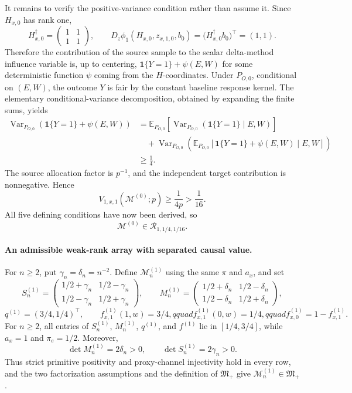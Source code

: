It remains to verify the positive-variance condition rather than assume it. Since \(H_{x,0}\) has rank one,
\[
H_{x,0}^{\dagger}=
\begin{pmatrix}1&1\\1&1\end{pmatrix},
\qquad
D_z\phi_1(H_{x,0},z_{x,1,0},b_0)
=\bigl(H_{x,0}^{\dagger}b_0\bigr)^{\top}=(1,1).
\]
Therefore the contribution of the source sample to the scalar delta-method influence variable is, up to centering, \(\mathbf 1\{Y=1\}+\psi(E,W)\) for some deterministic function \(\psi\) coming from the \(H\)-coordinates. Under \(P_{O,0}\), conditional on \((E,W)\), the outcome \(Y\) is fair by the constant baseline response kernel. The elementary conditional-variance decomposition, obtained by expanding the finite sums, yields
\[
\begin{split}
\operatorname{Var}_{P_{O,0}}\!\left(\mathbf 1\{Y=1\}+\psi(E,W)\right)
&=\mathbb E_{P_{O,0}}\!\left[\operatorname{Var}_{P_{O,0}}\!\left(\mathbf 1\{Y=1\}\mid E,W\right)\right]\\
&\quad+\operatorname{Var}_{P_{O,0}}\!\left(
\mathbb E_{P_{O,0}}[\mathbf 1\{Y=1\}+\psi(E,W)\mid E,W]
\right)\\
&\ge\frac14.
\end{split}
\]
The source allocation factor is \(p^{-1}\), and the independent target contribution is nonnegative. Hence
\[
V_{1,x,1}(\mathcal M^{(0)};p)\ge\frac{1}{4p}>\frac1{16}.
\]
All five defining conditions have now been derived, so
\[
\mathcal M^{(0)}\in\mathcal R_{1,1/4,1/16}.
\]

\paragraph{An admissible weak-rank array with separated causal value.}
For \(n\ge2\), put \(\gamma_n=\delta_n=n^{-2}\). Define \(\mathcal M^{(1)}_n\) using the same \(\pi\) and \(a_x\), and set
\[
S^{(1)}_n=
\begin{pmatrix}
1/2+\gamma_n&1/2-\gamma_n\\
1/2-\gamma_n&1/2+\gamma_n
\end{pmatrix},\qquad
M^{(1)}_n=
\begin{pmatrix}
1/2+\delta_n&1/2-\delta_n\\
1/2-\delta_n&1/2+\delta_n
\end{pmatrix},
\]
\[
q^{(1)}=(3/4,1/4)^{\top},\qquad
f^{(1)}_{x,1}(1,w)=3/4,qquad
f^{(1)}_{x,1}(0,w)=1/4,qquad
f^{(1)}_{x,0}=1-f^{(1)}_{x,1}.
\]
For \(n\ge2\), all entries of \(S^{(1)}_n\), \(M^{(1)}_n\), \(q^{(1)}\), and \(f^{(1)}\) lie in \([1/4,3/4]\), while \(a_x=1\) and \(\pi_e=1/2\). Moreover,
\[
\det M^{(1)}_n=2\delta_n>0,
\qquad
\det S^{(1)}_n=2\gamma_n>0.
\]
Thus strict primitive positivity and proxy-channel injectivity hold in every row, and the two factorization assumptions and the definition of \(\mathfrak M_{+}\) give \(\mathcal M^{(1)}_n\in\mathfrak M_{+}\).

